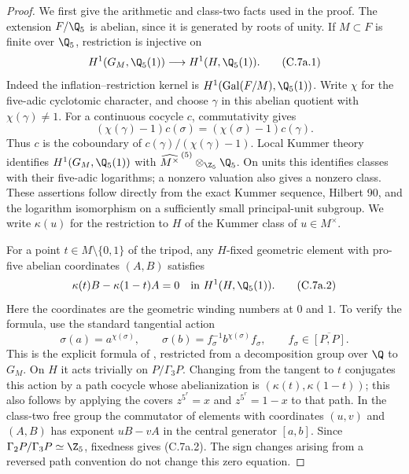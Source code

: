 \begin{proof}
We first give the arithmetic and class-two facts used in the proof.
The extension $F/\Q_5$ is abelian, since it is generated by roots of unity.
If $M\subset F$ is finite over $\Q_5$, restriction is injective on
\[
 H^1(G_M,\Q_5(1))\longrightarrow H^1(H,\Q_5(1)).                 \tag{C.7a.1}
\]
Indeed the inflation--restriction kernel is
$H^1(\operatorname{Gal}(F/M),\Q_5(1))$. Write $\chi$ for the five-adic
cyclotomic character, and choose $\gamma$ in this abelian quotient with
$\chi(\gamma)\ne1$. For a continuous cocycle $c$, commutativity gives
\[
 (\chi(\gamma)-1)c(\sigma)=(\chi(\sigma)-1)c(\gamma).
\]
Thus $c$ is the coboundary of $c(\gamma)/(\chi(\gamma)-1)$.
Local Kummer theory identifies $H^1(G_M,\Q_5(1))$ with
$\widehat{M^\times}^{\,(5)}\otimes_{\Z_5}\Q_5$. On units this identifies
classes with their five-adic logarithms; a nonzero valuation also gives
a nonzero class. These assertions follow directly from the exact Kummer
sequence, Hilbert 90, and the logarithm isomorphism on a sufficiently
small principal-unit subgroup. We write $\kappa(u)$ for the restriction
to $H$ of the Kummer class of $u\in M^\times$.

For a point $t\in M\setminus\{0,1\}$ of the tripod, any $H$-fixed
geometric element with pro-five abelian coordinates $(A,B)$ satisfies
\[
 \kappa(t) B-\kappa(1-t) A=0
 \quad\hbox{in }H^1(H,\Q_5(1)).                              \tag{C.7a.2}
\]
Here the coordinates are the geometric winding numbers at $0$ and $1$.
To verify the formula, use the standard tangential action
\[
 \sigma(a)=a^{\chi(\sigma)},\qquad
 \sigma(b)=f_\sigma^{-1}b^{\chi(\sigma)}f_\sigma,
 \qquad f_\sigma\in\overline{[P,P]}.
\]
This is the explicit formula of
\citet[\S2, equation (2.1) and the following paragraph]{BC_NakamuraSchneps2000},
restricted from a decomposition group over $\Q$ to $G_M$.
On $H$ it acts trivially on $P/\Gamma_3P$.
Changing from the tangent to $t$ conjugates this action by a path cocycle
whose abelianization is $(\kappa(t),\kappa(1-t))$; this also follows by
applying the covers $z^{5^r}=x$ and $z^{5^r}=1-x$ to that path.
In the class-two free group the commutator of elements with coordinates
$(u,v)$ and $(A,B)$ has exponent $uB-vA$ in the central generator $[a,b]$.
Since $\Gamma_2P/\Gamma_3P\simeq\Z_5$, fixedness gives (C.7a.2).
The sign changes arising from a reversed path convention do not change
this zero equation.


\end{proof}
